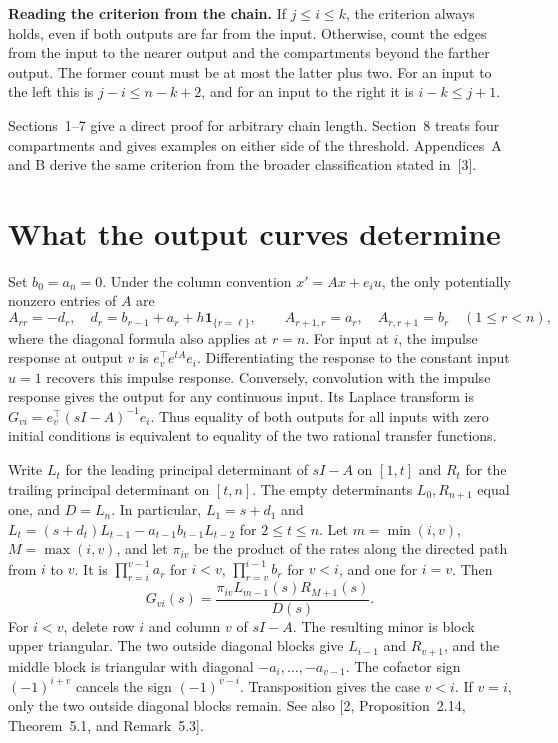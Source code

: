 \documentclass[11pt,a4paper]{article}
\newcommand{\ind}{\mathbf{1}}
\newcommand{\sect}[1]{\section{#1}}
\begin{document}
\noindent\textbf{Reading the criterion from the chain.}
If \(j\le i\le k\), the criterion always holds, even if both outputs are far from the input. Otherwise, count the edges from the input to the nearer output and the compartments beyond the farther output. The former count must be at most the latter plus two. For an input to the left this is \(j-i\le n-k+2\), and for an input to the right it is \(i-k\le j+1\).

Sections~1--7 give a direct proof for arbitrary chain length. Section~8 treats four compartments and gives examples on either side of the threshold. Appendices~A and B derive the same criterion from the broader classification stated in~[3].

\sect{What the output curves determine}
Set \(b_0=a_n=0\). Under the column convention \(x'=Ax+e_i u\), the only potentially nonzero entries of \(A\) are
\[
 A_{rr}=-d_r,\quad d_r=b_{r-1}+a_r+h\ind_{\{r=\ell\}},\qquad
 A_{r+1,r}=a_r,\quad A_{r,r+1}=b_r\quad(1\le r<n),
\]
where the diagonal formula also applies at \(r=n\). For input at \(i\), the impulse response at output \(v\) is \(e_v^\top e^{tA}e_i\). Differentiating the response to the constant input \(u=1\) recovers this impulse response. Conversely, convolution with the impulse response gives the output for any continuous input. Its Laplace transform is \(G_{vi}=e_v^\top(sI-A)^{-1}e_i\). Thus equality of both outputs for all inputs with zero initial conditions is equivalent to equality of the two rational transfer functions.

Write \(L_t\) for the leading principal determinant of \(sI-A\) on \([1,t]\) and \(R_t\) for the trailing principal determinant on \([t,n]\). The empty determinants \(L_0,R_{n+1}\) equal one, and \(D=L_n\). In particular, \(L_1=s+d_1\) and
\(L_t=(s+d_t)L_{t-1}-a_{t-1}b_{t-1}L_{t-2}\) for \(2\le t\le n\).
Let \(m=\min(i,v)\), \(M=\max(i,v)\), and let \(\pi_{iv}\) be the product of the rates along the directed path from \(i\) to \(v\). It is \(\prod_{r=i}^{v-1}a_r\) for \(i<v\), \(\prod_{r=v}^{i-1}b_r\) for \(v<i\), and one for \(i=v\). Then
\begin{equation}
 G_{vi}(s)=\frac{\pi_{iv}L_{m-1}(s)R_{M+1}(s)}{D(s)}. \label{eq:transfer}
\end{equation}
For \(i<v\), delete row \(i\) and column \(v\) of \(sI-A\). The resulting minor is block upper triangular. The two outside diagonal blocks give \(L_{i-1}\) and \(R_{v+1}\), and the middle block is triangular with diagonal \(-a_i,\ldots,-a_{v-1}\). The cofactor sign \((-1)^{i+v}\) cancels the sign \((-1)^{v-i}\). Transposition gives the case \(v<i\). If \(v=i\), only the two outside diagonal blocks remain. See also [2, Proposition~2.14, Theorem~5.1, and Remark~5.3].
\end{document}

